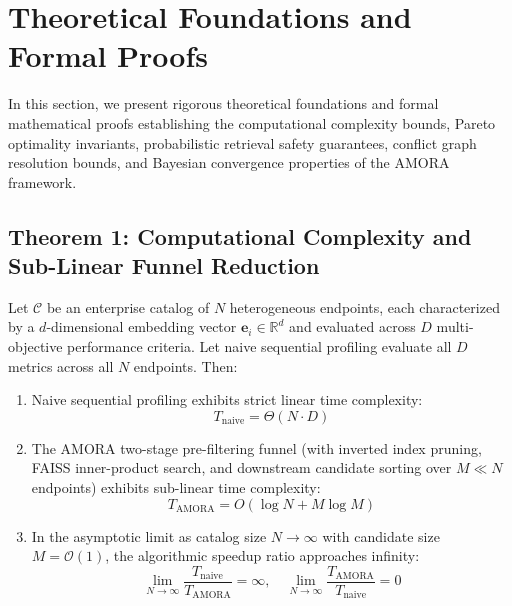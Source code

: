 \section{Theoretical Foundations and Formal Proofs}
\label{sec:theoretical_proofs}

In this section, we present rigorous theoretical foundations and formal mathematical proofs establishing the computational complexity bounds, Pareto optimality invariants, probabilistic retrieval safety guarantees, conflict graph resolution bounds, and Bayesian convergence properties of the AMORA framework.

\subsection{Theorem 1: Computational Complexity and Sub-Linear Funnel Reduction}
\label{subsec:proof_complexity}

\begin{theorem}
Let $\mathcal{C}$ be an enterprise catalog of $N$ heterogeneous endpoints, each characterized by a $d$-dimensional embedding vector $\mathbf{e}_i \in \mathbb{R}^d$ and evaluated across $D$ multi-objective performance criteria. Let naive sequential profiling evaluate all $D$ metrics across all $N$ endpoints. Then:
\begin{enumerate}
    \item Naive sequential profiling exhibits strict linear time complexity:
    \begin{equation}
        T_{\text{naive}} = \Theta(N \cdot D)
    \end{equation}
    \item The AMORA two-stage pre-filtering funnel (with inverted index pruning, FAISS inner-product search, and downstream candidate sorting over $M \ll N$ endpoints) exhibits sub-linear time complexity:
    \begin{equation}
        T_{\text{AMORA}} = O(\log N + M \log M)
    \end{equation}
    \item In the asymptotic limit as catalog size $N \to \infty$ with candidate size $M = \mathcal{O}(1)$, the algorithmic speedup ratio approaches infinity:
    \begin{equation}
        \lim_{N \to \infty} \frac{T_{\text{naive}}}{T_{\text{AMORA}}} = \infty, \quad \lim_{N \to \infty} \frac{T_{\text{AMORA}}}{T_{\text{naive}}} = 0
    \end{equation}
\end{enumerate}
\end{theorem}

